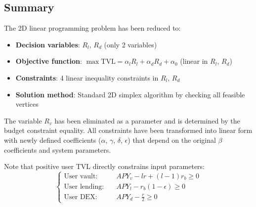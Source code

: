 \documentclass{article}
\begin{document}
\subsection{Summary}

The 2D linear programming problem has been reduced to:

\begin{itemize}
    \item \textbf{Decision variables}: $R_l$, $R_d$ (only 2 variables)
    \item \textbf{Objective function}: $\max \text{TVL} = \alpha_l R_l + \alpha_d R_d + \alpha_0$ (linear in $R_l$, $R_d$)
    \item \textbf{Constraints}: 4 linear inequality constraints in $R_l$, $R_d$
    \item \textbf{Solution method}: Standard 2D simplex algorithm by checking all feasible vertices
\end{itemize}

The variable $R_v$ has been eliminated as a parameter and is determined by the budget constraint equality. All constraints have been transformed into linear form with newly defined coefficients ($\alpha$, $\gamma$, $\delta$, $\epsilon$) that depend on the original $\beta$ coefficients and system parameters.

Note that positive user TVL directly constrains input parameters:
\begin{equation}
    \left\{
    \begin{aligned}
    \text{User vault:} \quad &APY_v - lr + (l-1)r_b \geq 0 \\
    \text{User lending:} \quad &APY_l - r_b(1-\epsilon) \geq 0 \\
    \text{User DEX:} \quad &APY_d - \frac{r}{2} \geq 0
    \end{aligned}
    \right.
\end{equation}
\end{document}
